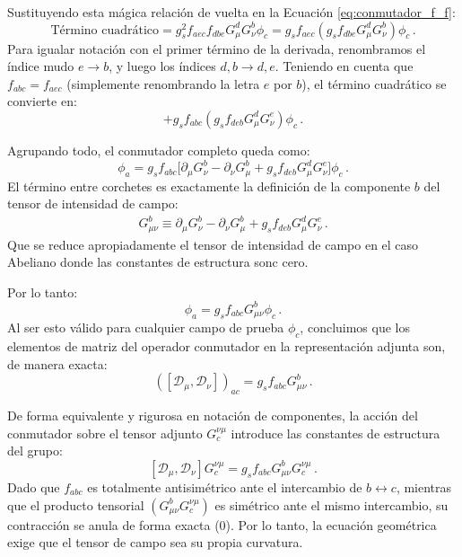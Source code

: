 Sustituyendo esta mágica relación de vuelta en la Ecuación \eqref{eq:conmutador_f_f}:
\begin{equation}
    \text{Término cuadrático} = g_s^2 f_{aec} f_{dbe} G_\mu^d G_\nu^b \phi_c = g_s f_{aec} \left( g_s f_{dbe} G_\mu^d G_\nu^b \right) \phi_c \, .
\end{equation}
Para igualar notación con el primer término de la derivada, renombramos el índice mudo $e \to b$, y luego los índices $d, b \to d, e$. Teniendo en cuenta que $f_{abc} = f_{aec}$ (simplemente renombrando la letra $e$ por $b$), el término cuadrático se convierte en:
\begin{equation}
    + g_s f_{abc} \left( g_s f_{deb} G_\mu^d G_\nu^e \right) \phi_c \, .
\end{equation}

Agrupando todo, el conmutador completo queda como:
\begin{equation}
    [\mathcal{D}_\mu, \mathcal{D}_\nu] \phi_a = g_s f_{abc} \Big[ \partial_\mu G_\nu^b - \partial_\nu G_\mu^b + g_s f_{deb} G_\mu^d G_\nu^e \Big] \phi_c \, .
\end{equation}
El término entre corchetes es exactamente la definición de la componente $b$ del tensor de intensidad de campo:
\begin{align}
  \label{eq:gmunu}
  G_{\mu\nu}^b\equiv \partial_\mu G_\nu^b - \partial_\nu G_\mu^b + g_s f_{deb} G_\mu^d G_\nu^e \,.
\end{align}
Que se reduce apropiadamente el tensor de intensidad de campo en el caso Abeliano donde las constantes de estructura sonc cero.

Por lo tanto:
\begin{equation}
    [\mathcal{D}_\mu, \mathcal{D}_\nu] \phi_a = g_s f_{abc} G_{\mu\nu}^b \phi_c \, .
\end{equation}
Al ser esto válido para cualquier campo de prueba $\phi_c$, concluimos que los elementos de matriz del operador conmutador en la representación adjunta son, de manera exacta:
\begin{equation}
    ([\mathcal{D}_\mu, \mathcal{D}_\nu])_{ac} = g_s f_{abc} G_{\mu\nu}^b \, .
\end{equation}

De forma equivalente y rigurosa en notación de componentes, la acción del conmutador sobre el tensor adjunto $G_c^{\nu\mu}$ introduce las constantes de estructura del grupo: 
$$ [\mathcal{D}_\mu, \mathcal{D}_\nu] G_c^{\nu\mu} = g_s f_{abc} G_{\mu\nu}^b G_c^{\nu\mu} \, . $$
Dado que $f_{abc}$ es totalmente antisimétrico ante el intercambio de $b \leftrightarrow c$, mientras que el producto tensorial $(G_{\mu\nu}^b G_c^{\nu\mu})$ es simétrico ante el mismo intercambio, su contracción se anula de forma exacta ($0$). Por lo tanto, la ecuación geométrica exige que el tensor de campo sea su propia curvatura.

